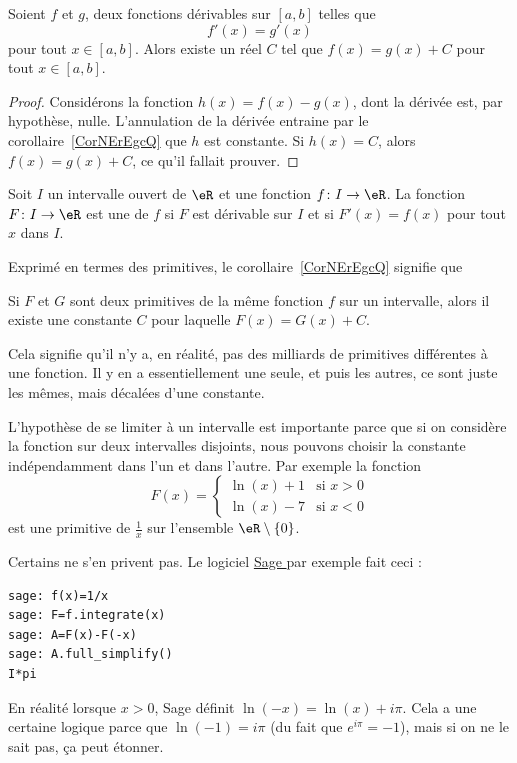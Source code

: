 \begin{corollary}   \label{CorNErEgcQ}
    Soient $f$ et $g$, deux fonctions dérivables sur $[a,b]$ telles que
    \begin{equation}
        f'(x) = g'(x)
    \end{equation}
    pour tout $x \in [a,b]$. Alors existe un réel $C$ tel que $f (x) = g (x) + C$ pour tout $x\in [a,b]$.
\end{corollary}

\begin{proof}
    Considérons la fonction $h(x)=f(x)-g(x)$, dont la dérivée est, par hypothèse, nulle. L'annulation de la dérivée entraine par le corollaire~\ref{CorNErEgcQ} que $h$ est  constante. Si $h(x)=C$, alors $f(x)=g(x)+C$, ce qu'il fallait prouver.
\end{proof}

\begin{definition}  \label{DefXVMVooWhsfuI}
    Soit \( I\) un intervalle ouvert de \( \eR\) et une fonction \( f\colon I\to \eR\). La fonction \( F\colon I\to \eR\) est une  de \( f\) si \( F\) est dérivable sur \( I\) et si \( F'(x)=f(x)\) pour tout \( x\) dans \( I\).
\end{definition}

Exprimé en termes des primitives, le corollaire~\ref{CorNErEgcQ} signifie que
\begin{corollary}  \label{CorZeroCst}
    Si $F$ et $G$ sont deux primitives de la même fonction $f$ sur un intervalle, alors il existe une constante $C$ pour laquelle $F(x)=G(x)+C$.
\end{corollary}
Cela signifie qu'il n'y a, en réalité, pas des milliards de primitives différentes à une fonction. Il y en a essentiellement une seule, et puis les autres, ce sont juste les mêmes, mais décalées d'une constante.

\begin{remark}
    L'hypothèse de se limiter à un intervalle est importante parce que si on considère la fonction sur deux intervalles disjoints, nous pouvons choisir la constante indépendamment dans l'un et dans l'autre. Par exemple la fonction
    \begin{equation}
        F(x)=\begin{cases}
            \ln(x)+1    &   \text{si } x>0\\
            \ln(x)-7    &    \text{si } x<0
        \end{cases}
    \end{equation}
    est une primitive de \( \frac{1}{ x }\) sur l'ensemble \( \eR\setminus\{ 0 \}\).

    Certains ne s'en privent pas. Le logiciel \href{https://www.sagemath.org}{ Sage } par exemple fait ceci :
    \begin{verbatim}
sage: f(x)=1/x
sage: F=f.integrate(x)
sage: A=F(x)-F(-x)
sage: A.full_simplify()
I*pi
    \end{verbatim}
    En réalité lorsque \( x>0\), Sage définit \( \ln(-x)=\ln(x)+i\pi\). Cela a une certaine logique parce que \( \ln(-1)=i\pi\) (du fait que \(  e^{i\pi}=-1\)), mais si on ne le sait pas, ça peut étonner.
\end{remark}

